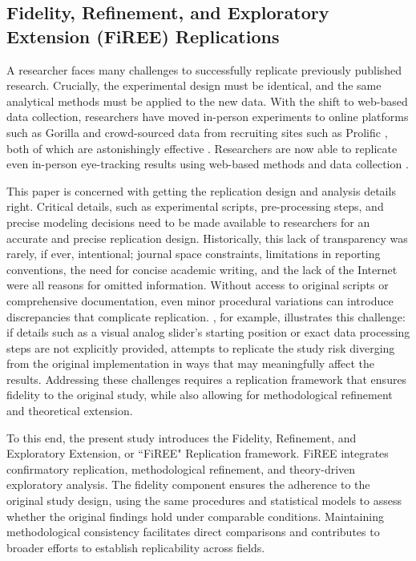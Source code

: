 \subsection{Fidelity, Refinement, and Exploratory Extension (FiREE) Replications}

A researcher faces many challenges to successfully replicate previously published research. Crucially, the experimental design must be identical, and the same analytical methods must be applied to the new data. With the shift to web-based data collection, researchers have moved in-person experiments to online platforms such as Gorilla \citep{Anwyl-Irvine_2019} and crowd-sourced data from recruiting sites such as Prolific \citep{douglas2023data}, both of which are astonishingly effective \citep{tomczak2023over, eerola2021online}. Researchers are now able to replicate even in-person eye-tracking results using web-based methods and data collection \citep[see ][] {semmelmann2018online, Vos_2022, Prystauka_Altmann_Rothman_2023}. 

This paper is concerned with getting the replication design and analysis details right. Critical details, such as experimental scripts, pre-processing steps, and precise modeling decisions need to be made available to researchers for an accurate and precise replication design. Historically, this lack of transparency was rarely, if ever, intentional; journal space constraints, limitations in reporting conventions, the need for concise academic writing, and the lack of the Internet were all reasons for omitted information. Without access to original scripts or comprehensive documentation, even minor procedural variations can introduce discrepancies that complicate replication. \cite{AOW}, for example, illustrates this challenge: if details such as a visual analog slider's starting position or exact data processing steps are not explicitly provided, attempts to replicate the study risk diverging from the original implementation in ways that may meaningfully affect the results. Addressing these challenges requires a replication framework that ensures fidelity to the original study, while also allowing for methodological refinement and theoretical extension.

To this end, the present study introduces the Fidelity, Refinement, and Exploratory Extension, or ``FiREE" Replication framework. FiREE integrates confirmatory replication, methodological refinement, and theory-driven exploratory analysis. The fidelity component ensures the adherence to the original study design, using the same procedures and statistical models to assess whether the original findings hold under comparable conditions. Maintaining methodological consistency facilitates direct comparisons and contributes to broader efforts to establish replicability across fields. 

